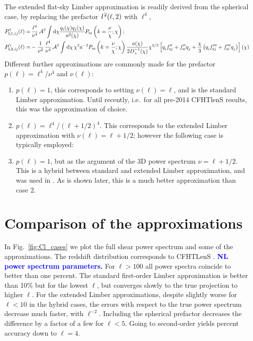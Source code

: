 \documentclass[fleqn,usenatbib]{mnras} %
\newcommand{\ellbar}{\hbox{\it \l}\,}
\newcommand{\pref}{{\cal A}}
\newcommand{\mk}[1]{{\bf\textcolor{blue}{#1}}}
\begin{document}
The extended flat-sky Limber approximation is readily derived from the
spherical case, by replacing the prefactor $\ellbar^2(\ell, 2)$ with $\ell^4$,
%
\begin{align}
  P^\gamma_{{\rm L1}, ij}(\ell) = & \, \frac{\ell^4}{\nu^4} \, \pref^2 \int {\rm d} \chi \frac{ q_i(\chi) q_j(\chi) }{a^2(\chi)}
  P_{\rm m}\left(k = \frac{\nu}{\chi}; \chi\right);
  \label{eq:P_ell_limber1}
  \\
    P^\gamma_{{\rm L2}, ij}(\ell) = & - \frac 1 {\nu^2} \, \frac{\ell^4}{\nu^4} \, \pref^2
    \int {\rm d} \chi \, \chi^{2} a^{-2} P_{\rm m}\left(k = \frac\nu\chi; \chi\right)
    \frac{a(\chi)}{2 D^{-1}_+(\chi)} \chi^{3/2} \left[ q^{}_i f^{\prime\prime}_{{\rm s}j} + f^{\prime\prime}_{{\rm s}i} q^{}_j  
      + \frac{\chi}{3} \left( q^{}_i f^{\prime\prime\prime}_{{\rm s}j} + f^{\prime\prime\prime}_{{\rm s}i} q^{}_j
      \right)
    \right](\chi)
  \label{eq:P_ell_limber2}
\end{align}
%
Different further approximations are commonly made for the prefactor $p(\ell) = \ell^4/\nu^4$ and $\nu(\ell)$:
%
\begin{enumerate}
  \item $p(\ell) = 1$, this corresponds to setting $\nu(\ell) = \ell$, and is the standard Limber approximation.
    Until recently, i.e.~for all pre-2014 CFHTlenS results, this was the approximation of choice.
  \item $p(\ell) = \ell^4/(\ell + 1/2)^4$. This corresponds to the extended Limber
    approximation with $\nu(\ell) = \ell + 1/2$; however the following case is typically employed:
  \item $p(\ell) = 1$, but as the argument of the 3D power spectrum $\nu = \ell + 1/2$. This is a hybrid between
    standard and extended Limber approximation, and was used in \cite{KiDS-450,joudaki/etal:2016}. As is shown
    later, this is a much better approximation than case 2.
\end{enumerate}

\section{Comparison of the approximations}
\label{sec:comp}

In Fig.~\ref{fig:Cl_cases} we plot the full shear power spectrum and some of
the approximations. The redshift distribution corresponds to CFHTLenS
\cite{CFHTLenS-2pt-notomo}. \mk{NL power spectrum parameters.}
For $\ell > 100$ all power spectra coincide to
better than one percent. The standard first-order Limber approximation is
better than 10\% but for the lowest $\ell$, but converges slowly to the true
projection to higher $\ell$. For the extended Limber approximations, despite
slightly worse for $\ell < 10$ in the hybrid cases, the errors with respect to
the true power spectrum decrease much faster, with $\ell^{-2}$. Including the
spherical prefactor decreases the difference by a factor of a few for $\ell <
5$. Going to second-order yields percent accuracy down to $\ell = 4$.
\end{document}
